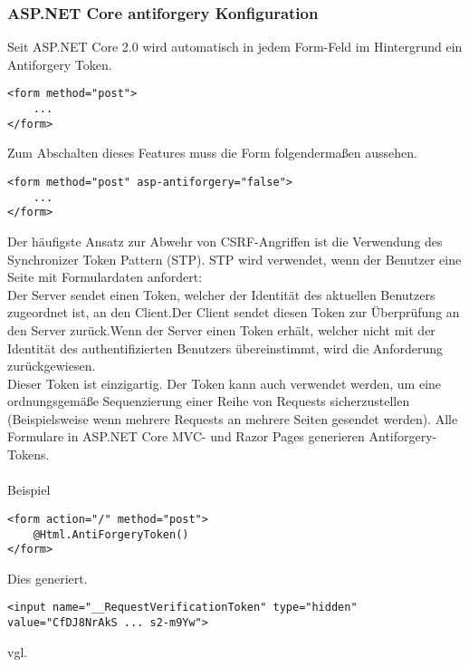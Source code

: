 {\subsubsection{ASP.NET Core antiforgery Konfiguration}
Seit ASP.NET Core 2.0 wird automatisch in jedem Form-Feld im Hintergrund ein Antiforgery Token.
\begin{lstlisting}
<form method="post">
    ...
</form>
\end{lstlisting}
Zum Abschalten dieses Features muss die Form folgendermaßen aussehen.
\begin{lstlisting}
<form method="post" asp-antiforgery="false">
    ...
</form>
\end{lstlisting}
Der häufigste Ansatz zur Abwehr von CSRF-Angriffen ist die Verwendung des Synchronizer Token Pattern (STP). STP wird verwendet, wenn der Benutzer eine Seite mit Formulardaten anfordert:\\Der Server sendet einen Token, welcher der Identität des aktuellen Benutzers zugeordnet ist, an den Client.Der Client sendet diesen Token zur Überprüfung an den Server zurück.Wenn der Server einen Token erhält, welcher nicht mit der Identität des authentifizierten Benutzers übereinstimmt, wird die Anforderung zurückgewiesen.\\Dieser Token ist einzigartig. Der Token kann auch verwendet werden, um eine ordnungsgemäße Sequenzierung einer Reihe von Requests sicherzustellen (Beispielsweise wenn mehrere Requests an mehrere Seiten gesendet werden). Alle Formulare in ASP.NET Core MVC- und Razor Pages generieren Antiforgery-Tokens.\\ \\Beispiel\\
\begin{lstlisting}
<form action="/" method="post">
    @Html.AntiForgeryToken()
</form>
\end{lstlisting}
Dies generiert.\\
\begin{lstlisting}
<input name="__RequestVerificationToken" type="hidden" value="CfDJ8NrAkS ... s2-m9Yw">
\end{lstlisting}
vgl. \textcite{CSRF-Protection}
}
